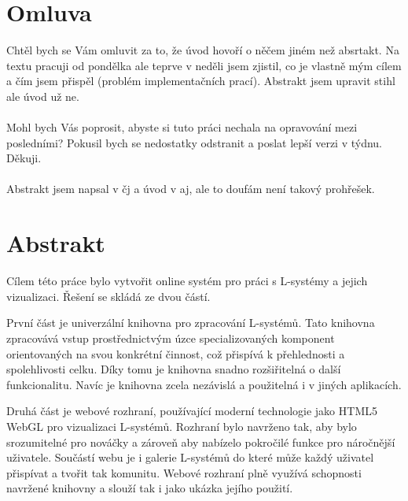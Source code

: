 \section*{Omluva}
Chtěl bych se Vám omluvit za to, že úvod hovoří o něčem jiném než absrtakt.
Na textu pracuji od pondělka ale teprve v neděli jsem zjistil, co je vlastně mým cílem a čím jsem přispěl (problém implementačních prací).
Abstrakt jsem upravit stihl ale úvod už ne.
\\
\\
Mohl bych Vás poprosit, abyste si tuto práci nechala na opravování mezi posledními?
Pokusil bych se nedostatky odstranit a poslat lepší verzi v týdnu. Děkuji.
\\
\\
Abstrakt jsem napsal v čj a úvod v aj, ale to doufám není takový prohřešek.


\section*{Abstrakt}


Cílem této práce bylo vytvořit online systém pro práci s L-systémy a jejich vizualizaci.
Řešení se skládá ze dvou částí.

První část je univerzální knihovna pro zpracování L-systémů.%
Tato knihovna zpracovává vstup prostřednictvým úzce specializovaných komponent orientovaných na svou konkrétní činnost, což přispívá k přehlednosti a spolehlivosti celku.
Díky tomu je knihovna snadno rozšiřitelná o další funkcionalitu.
Navíc je knihovna zcela nezávislá a použitelná i v jiných aplikacích.

Druhá část je webové rozhraní, používající moderní technologie jako HTML5 WebGL pro vizualizaci L-systémů.
Rozhraní bylo navrženo tak, aby bylo srozumitelné pro nováčky a zároveň aby nabízelo pokročilé funkce pro náročnější uživatele.
Součástí webu je i galerie L-systémů do které může každý uživatel přispívat a tvořit tak komunitu.
Webové rozhraní plně využívá schopnosti navržené knihovny a slouží tak i jako ukázka jejího použití.





























